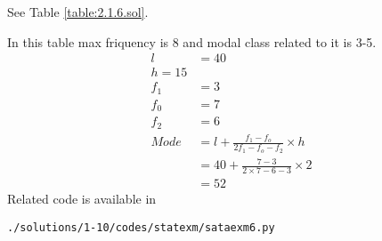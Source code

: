 See Table \ref{table:2.1.6.sol}.
 \begin{table}[!ht]
	\centering
	
	\caption{}
\label{table:2.1.6.sol}
\end{table}
In this table max friquency is 8 and modal class related to it is 3-5.
\\
\begin{align}
l &= 40
\\
h = 15
\\
f_1 &= 3
\\
f_0 &= 7
\\
f_2 &= 6
\\
Mode &= l+\frac{f_1 - f_o}{2f_1 - f_o - f_2}\times h
\\
&= 40 +\frac{7 - 3}{2\times 7 - 6- 3}\times 2
\\
&=52
\end{align}
Related code is available in 
\begin{lstlisting}
./solutions/1-10/codes/statexm/sataexm6.py
\end{lstlisting}
